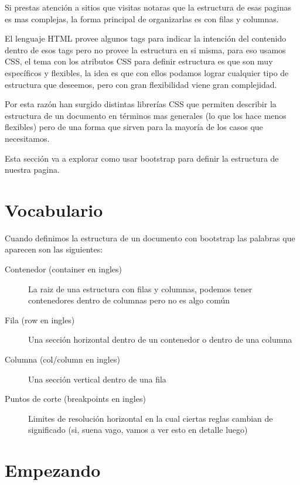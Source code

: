 \documentclass[letterpaper,10pt,spanish]{sphinxmanual}
\begin{document}
Si prestas atención a sitios que visitas notaras que la estructura de esas
paginas es mas complejas, la forma principal de organizarlas es con filas y
columnas.

El lenguaje HTML provee algunos tags para indicar la intención del contenido
dentro de esos tags pero no provee la estructura en si misma, para eso usamos
CSS, el tema con los atributos CSS para definir estructura es que son muy
específicos y flexibles, la idea es que con ellos podamos lograr cualquier tipo
de estructura que deseemos, pero con gran flexibilidad viene gran complejidad.

Por esta razón han surgido distintas librerías CSS que permiten describir la
estructura de un documento en términos mas generales (lo que los hace menos
flexibles) pero de una forma que sirven para la mayoría de los casos que
necesitamos.

Esta sección va a explorar como usar bootstrap para definir la estructura de
nuestra pagina.


\section{Vocabulario}
\label{\detokenize{filas-columnas:vocabulario}}
Cuando definimos la estructura de un documento con bootstrap las palabras que
aparecen son las siguientes:
\begin{description}
\item[{Contenedor (container en ingles)}] \leavevmode
La raiz de una estructura con filas y columnas, podemos tener contenedores
dentro de columnas pero no es algo común

\item[{Fila (row en ingles)}] \leavevmode
Una sección horizontal dentro de un contenedor o dentro de una columna

\item[{Columna (col/column en ingles)}] \leavevmode
Una sección vertical dentro de una fila

\item[{Puntos de corte (breakpoints en ingles)}] \leavevmode
Limites de resolución horizontal en la cual ciertas reglas cambian de
significado (si, suena vago, vamos a ver esto en detalle luego)

\end{description}


\section{Empezando}
\label{\detokenize{filas-columnas:empezando}}
\end{document}
